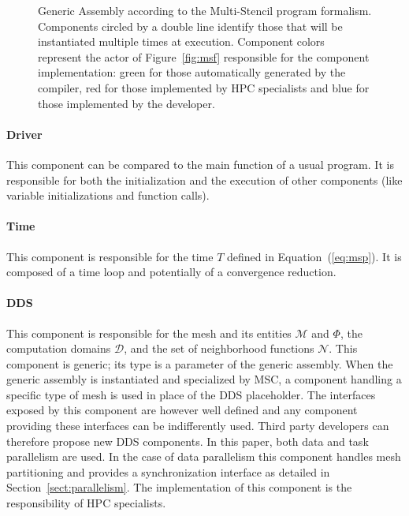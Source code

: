 \begin{figure}[t]
\begin{center}
\vspace*{.5em}
\caption{Generic Assembly according to the Multi-Stencil program formalism.
Components circled by a double line identify those that will be instantiated multiple times at execution.
Component colors represent the actor of Figure~\ref{fig:msf} responsible for the component implementation: green for those automatically generated by the compiler, red for those implemented by HPC specialists and blue for those implemented by the developer.}
\label{fig:ga}
\end{center}
\end{figure}

\paragraph{\textbf{Driver}}
This component can be compared to the main function of a usual program. It is responsible for both the initialization and the execution of other components (like variable initializations and function calls).

\paragraph{\textbf{Time}}
This component is responsible for the time $T$ defined in Equation~(\ref{eq:msp}). It is composed of a time loop and potentially of a convergence reduction.

\paragraph{\textbf{DDS}}
This component is responsible for the mesh and its entities $\mathcal{M}$ and $\Phi$, the computation domains $\mathcal{D}$, and the set of neighborhood functions $\mathcal{N}$.
This component is generic; its type is a parameter of the generic assembly.
When the generic assembly is instantiated and specialized by MSC, a component handling a specific type of mesh is used in place of the DDS placeholder.
The interfaces exposed by this component are however well defined and any component providing these interfaces can be indifferently used.
Third party developers can therefore propose new DDS components.
In this paper, both data and task parallelism are used. In the case of data parallelism this component handles mesh partitioning and provides a synchronization interface as detailed in Section~\ref{sect:parallelism}.
The implementation of this component is the responsibility of HPC specialists.

